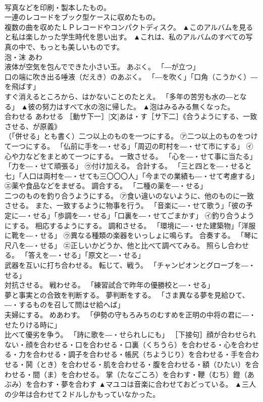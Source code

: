 \documentclass[8pt]{extreport}
\begin{document}
\begin{CJK}{UTF8}{min}
\\	写真などを印刷・製本したもの。 
\\	一連のレコードをブック型ケースに収めたもの。 
\\	複数の曲を収めたＬＰレコードやコンパクトディスク。	▲このアルバムを見ると私は楽しかった学生時代を思い出す。 ▲これは、私のアルバムのすべての写真の中で、もっとも美しいものです。
\\	泡・沫	あわ	
\\	液体が空気を包んでできた小さい玉。 あぶく。 「―が立つ」 
\\	口の端に吹き出る唾液（だえき）のあぶく。 「―を吹く」「口角（こうかく）―を飛ばす」 
\\	すぐ消えるところから、はかないことのたとえ。 「多年の苦労も水の―となる」	▲彼の努力はすべて水の泡に帰した。 ▲泡はみるみる無くなった。
\\	合わせる	あわせる	［動サ下一］[文]あは・す［サ下二］《合うようにする、一致させる、が原義》 
\\	（「併せる」とも書く）二つ以上のものを一つにする。 ㋐二つ以上のものをつけて一つにする。 「仏前に手を―・せる」「周辺の町村を―・せて市にする」 ㋑心や力などをまとめて一つにする。 一致させる。 「心を―・せて事に当たる」「力を―・せて頑張る」 ㋒付け加える。 合計する。 「三と四とを―・せると七」「人口は両村を―・せても三〇〇〇人」「今までの業績も―・せて考慮する」 ㋓薬や食品などをまぜる。 調合する。 「二種の薬を―・せる」 
\\	二つのものを釣り合うようにする。 ㋐食い違いのないように、他のものに一致させる。 また、一致するように物事を行う。 「音楽に―・せて歌う」「彼の予定に―・せる」「歩調を―・せる」「口裏を―・せてごまかす」 ㋑釣り合うようにする。 相応するようにする。 調和させる。 「環境に―・せた建築物」「洋服に靴を―・せる」 ㋒異なる種類の楽器をいっしょに鳴らす。 合奏する。 「琴に尺八を―・せる」 ㋓正しいかどうか、他と比べて調べてみる。 照らし合わせる。 「答えを―・せる」「原文と―・せる」 
\\	武器を互いに打ち合わせる。 転じて、戦う。 「チャンピオンとグローブを―・せる」 
\\	対抗させる。 戦わせる。 「練習試合で昨年の優勝校と―・せる」 
\\	夢と事実との合致を判断する。 夢判断をする。 「さま異なる夢を見給ひて、―・するものを召して問はせ給へば」 
\\	夫婦にする。 めあわす。 「伊勢の守もろみちのむすめを正明の中将の君に―・せたりける時に」 
\\	比べて優劣を争う。 「詩に歌を―・せられしにも」 ［下接句］顔が合わせられない・顔を合わせる・口を合わせる・口裏（くちうら）を合わせる・心を合わせる・力を合わせる・調子を合わせる・帳尻（ちようじり）を合わせる・手を合わせる・鬨（とき）を合わせる・肌を合わせる・腹を合わせる・額（ひたい）を合わせる・間（ま）を合わせる。 掌（たなごころ）を合わす・鞭（むち）鐙（あぶみ）を合わす・夢を合わす	▲マユコは音楽に合わせておどっている。 ▲三人の少年は合わせて２ドルしかもっていなかった。

\end{CJK}
\end{document}
